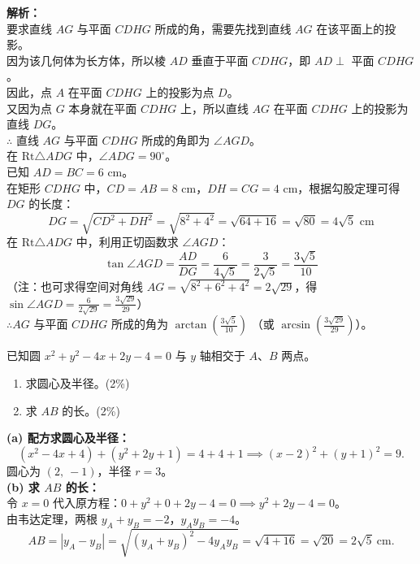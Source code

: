 \documentclass[12pt,a4paper]{exam-zh}
\begin{document}
\begin{solution}
    \textbf{解析：} \\
    要求直线 $AG$ 与平面 $CDHG$ 所成的角，需要先找到直线 $AG$ 在该平面上的投影。 \\
    因为该几何体为长方体，所以棱 $AD$ 垂直于平面 $CDHG$，即 $AD \perp$ 平面 $CDHG$。 \\
    因此，点 $A$ 在平面 $CDHG$ 上的投影为点 $D$。 \\
    又因为点 $G$ 本身就在平面 $CDHG$ 上，所以直线 $AG$ 在平面 $CDHG$ 上的投影为直线 $DG$。 \\
    $\therefore$ 直线 $AG$ 与平面 $CDHG$ 所成的角即为 $\angle AGD$。 \\
    在 $\text{Rt}\triangle ADG$ 中，$\angle ADG = 90^\circ$。 \\
    已知 $AD = BC = 6\text{ cm}$。 \\
    在矩形 $CDHG$ 中，$CD = AB = 8\text{ cm}$，$DH = CG = 4\text{ cm}$，根据勾股定理可得 $DG$ 的长度：
    \[ \displaystyle DG = \sqrt{CD^2 + DH^2} = \sqrt{8^2 + 4^2} = \sqrt{64 + 16} = \sqrt{80} = 4\sqrt{5}\text{ cm} \]
    在 $\text{Rt}\triangle ADG$ 中，利用正切函数求 $\angle AGD$：
    \[ \displaystyle \tan \angle AGD = \frac{AD}{DG} = \frac{6}{4\sqrt{5}} = \frac{3}{2\sqrt{5}} = \frac{3\sqrt{5}}{10} \]
    （注：也可求得空间对角线 $\displaystyle AG = \sqrt{8^2 + 6^2 + 4^2} = 2\sqrt{29}$，得 $\displaystyle \sin \angle AGD = \frac{6}{2\sqrt{29}} = \frac{3\sqrt{29}}{29}$） \\
    $\therefore AG$ 与平面 $CDHG$ 所成的角为 $\displaystyle \arctan\left(\frac{3\sqrt{5}}{10}\right)$ （或 $\displaystyle \arcsin\left(\frac{3\sqrt{29}}{29}\right)$）。
\end{solution}

\begin{question}
    已知圆 $x^2 + y^2 - 4x + 2y - 4 = 0$ 与 $y$ 轴相交于 $A$、$B$ 两点。
    \begin{enumerate}[label=(\alph*)]
        \item 求圆心及半径。\hfill(2\%)
        \item 求 $AB$ 的长。\hfill(2\%)
    \end{enumerate}
\end{question}

\begin{solution}
    \textbf{(a) 配方求圆心及半径：} \\
    \[
        (x^2 - 4x + 4) + (y^2 + 2y + 1) = 4 + 4 + 1
        \implies (x-2)^2 + (y+1)^2 = 9.
    \]
    圆心为 $(2,\ -1)$，半径 $r = 3$。 \\

    \textbf{(b) 求 $AB$ 的长：} \\
    令 $x = 0$ 代入原方程：$0 + y^2 + 0 + 2y - 4 = 0 \implies y^2 + 2y - 4 = 0$。 \\
    由韦达定理，两根 $y_A + y_B = -2$，$y_A y_B = -4$。 \\
    \[
        AB = |y_A - y_B| = \sqrt{(y_A+y_B)^2 - 4y_Ay_B} = \sqrt{4 + 16} = \sqrt{20} = 2\sqrt{5}\ \text{cm}.
    \]
\end{solution}
\end{document}
